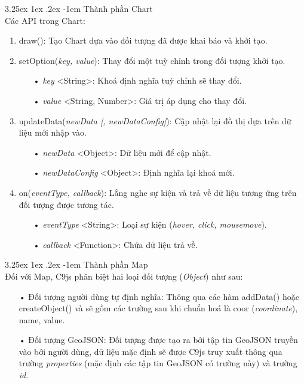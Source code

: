 \documentclass[12pt,a4paper,twoside]{article}
\makeatletter
\newcommand{\myparagraph}[1]{\paragraph{#1}\mbox{}\\} %
\renewcommand\paragraph{\@startsection{paragraph}{5}{\z@}%
  {3.25ex \@plus1ex \@minus.2ex}%
  {-1em}%
  {\normalfont\normalsize\bfseries}}
\makeatother
\begin{document}
\myparagraph{Thành phần Chart}
Các API trong Chart:
\begin{enumerate}
\item \textsf{draw():}  Tạo Chart dựa vào đối tượng đã được khai báo và khởi tạo.

\item \textsf{setOption(\textit{key, value})}: Thay đổi một tuỳ chỉnh trong đối tượng khởi tạo.
	\begin{itemize}
		\item[•] \textit{key} <String>: Khoá định nghĩa tuỳ chỉnh sẽ thay đổi.
		\item[•] \textit{value} <String, Number>: Giá trị áp dụng cho thay đổi.
	\end{itemize}
	
\item \textsf{updateData(\textit{newData [, newDataConfig]})}: Cập nhật lại đồ thị dựa trên dữ liệu mới nhập vào.
	\begin{itemize}
		\item[•] \textit{newData} <Object>: Dữ liệu mới để cập nhật.
		\item[•] \textit{newDataConfig } <Object>: Định nghĩa lại khoá mới.
	\end{itemize}
	
\item \textsf{on(\textit{eventType, callback})}: Lắng nghe sự kiện và trả về dữ liệu tương ứng trên đối tượng được tương tác.
	\begin{itemize}
		\item[•] \textit{eventType} <String>: Loại sự kiện (\textit{hover, click, mousemove}).
		\item[•] \textit{callback} <Function>: Chứa dữ liệu trả về.
	\end{itemize}
\end{enumerate}

\myparagraph{Thành phần Map}
Đối với Map, C9js phân biệt hai loại đối tượng (\textit{Object}) như sau: \label{sec:map_api}

\begin{itemize}
\item[•] Đối tượng người dùng tự định nghĩa: Thông qua các hàm \textsf{addData()} hoặc \textsf{createObject()} và sẽ gồm các trường sau khi chuẩn hoá là coor (\textit{coordinate}), name, value.
\item[•] Đối tượng GeoJSON: Đối tượng được tạo ra bởi tập tin GeoJSON truyền vào bởi người dùng, dữ liệu mặc định sẽ được C9js truy xuất thông qua trường \textit{properties} (mặc định các tập tin GeoJSON có trường này) và trường \textit{id}.
\end{itemize}
\end{document}
